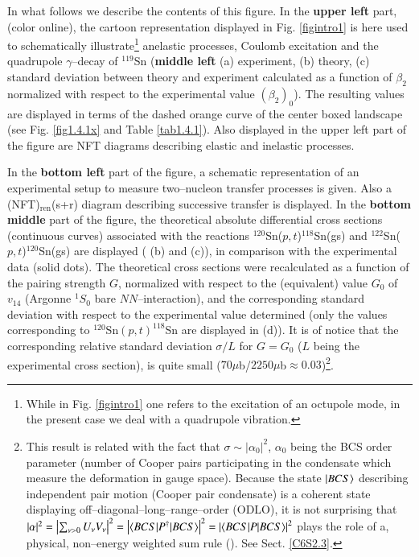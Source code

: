   
  In what follows we describe the contents of this figure. In the \textbf{upper left} part, (color online), the cartoon representation displayed in Fig. \ref{figintro1} is here used to schematically illustrate\footnote{While in Fig. \ref{figintro1} one refers to the excitation of an octupole mode, in the present case we deal with a quadrupole vibration.}  anelastic processes, Coulomb excitation and the quadrupole $\gamma$--decay of $^{119}$Sn (\textbf{middle left} (a) experiment, (b) theory, (c) standard deviation between theory and experiment calculated as a function of $\beta_2$ normalized with respect to the experimental value $(\beta_2)_0$). The resulting  values are displayed in terms of the dashed orange curve of the center boxed landscape (see Fig. \ref{fig1.4.1x} and Table \ref{tab1.4.1}). Also displayed in the upper left part of the figure are NFT diagrams describing elastic and inelastic processes.
  
  
  In the \textbf{bottom left} part of the figure, a schematic representation of an experimental setup to measure   two--nucleon transfer processes is given. Also a (NFT)$_{\text{ren}}$(s+r) diagram describing  successive transfer is displayed. In the \textbf{bottom middle} part of the figure, the theoretical absolute differential cross sections (continuous curves) associated with the reactions $^{120}$Sn($p,t$)$^{118}$Sn(gs) and $^{122}$Sn($p,t$)$^{120}$Sn(gs) are displayed ( (b) and (c)), in comparison with the experimental data (solid dots). The theoretical cross sections were recalculated as a function of the pairing strength $G$, normalized with respect to the (equivalent) value $G_0$ of $v_{14}$ (Argonne $^1S_0$ bare $NN$--interaction), and the corresponding standard deviation with respect to the experimental value determined (only the values corresponding to $^{120}$Sn$(p,t)^{118}$Sn are displayed in (d)). It is of notice that the corresponding relative standard deviation $\sigma/L$ for $G=G_0$  ($L$ being the experimental cross section),  is quite small ($70\mu$b/$2250\mu$b$\approx0.03$)\footnote{This result is related with the fact that $\sigma\sim|\alpha_0|^2$, $\alpha_0$ being the BCS order parameter (number of Cooper pairs participating in the condensate which measure the deformation in gauge space). Because the state $|{BCS} \rangle$ describing independent pair motion (Cooper pair condensate) is a coherent state displaying off--diagonal--long--range--order (ODLO), it is not surprising that $|\alpha|^2=\left|\sum_{\nu>0}U_\nu V_\nu\right|^2=\left|\langle {BCS|P^\dagger|BCS} \rangle\right|^2=\left|\langle {BCS|P|BCS} \rangle\right|^2$ plays the role of a, physical, non--energy weighted sum rule (\cite{Potel:17}). See Sect. \ref{C6S2.3}.}.
  
